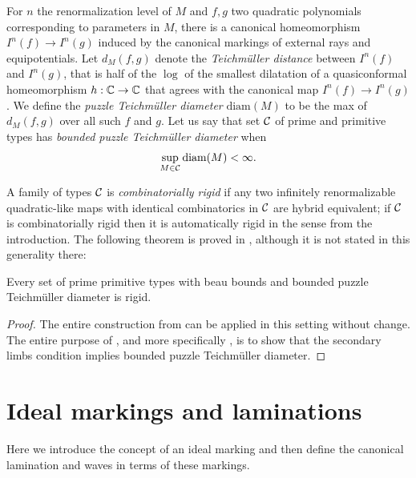 \documentclass[12pt]{amsart}
\begin{document}
For $n$ the renormalization level of $M$ and $f, g$ two quadratic polynomials corresponding to parameters in $M$, there is a canonical homeomorphism $I^n(f)\to I^n(g)$ induced by the canonical markings of external rays and equipotentials. 
Let $d_M(f, g)$ denote the \emph{Teichm\"uller distance}  between $I^n(f)$ and $I^n(g)$, that is half of the $\log$ of the smallest dilatation of a quasiconformal homeomorphism $h: \mathbb C\to \mathbb C$ that agrees with the canonical map $I^n(f)\to I^n(g)$. We define the \emph{puzzle Teichm\"uller diameter}  $\text{diam}(M)$ to 
be the max of $d_M(f, g)$ over all such $f$ and $g$.
Let us say that set $\mathcal C$ of prime and primitive types has \emph{bounded puzzle Teichm\"uller diameter}  when 
$$\sup_{M\in \mathcal C}\text{diam}(M)< \infty.$$

A family of types $\mathcal C$ is \emph{combinatorially rigid}  if any two infinitely renormalizable quadratic-like maps with identical combinatorics in $\mathcal C$ are hybrid equivalent; if $\mathcal C$ is combinatorially rigid then it is automatically rigid in the sense from the introduction.
The following theorem is proved in \cite{lyubich1997dynamics}, although it is not stated in this generality there:

\begin{thmB}
	Every set of prime primitive types with beau bounds and bounded puzzle Teichm\"uller diameter is rigid.
\end{thmB}

\begin{proof}
	The entire construction from \cite[Section 10]{lyubich1997dynamics} can be applied in this setting without change. The entire purpose of \cite[Section 11]{lyubich1997dynamics}, and more specifically \cite[Main Lemma]{lyubich1997dynamics}, is to show that the secondary limbs condition implies bounded puzzle Teichm\"uller diameter.
\end{proof}













\appendix
\section{Ideal markings and laminations}\label{app:markings}
Here we introduce the concept of an ideal marking and then define the canonical lamination and waves in terms of these markings. 
\end{document}
